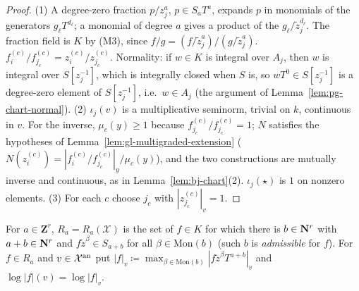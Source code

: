 \begin{proof}
(1) A degree-zero fraction $p/z_j^a$, $p\in S_a T^a$, expands $p$ in monomials of the generators $g_\ell T^{d_\ell}$; a monomial of degree $a$
gives a product of the $g_\ell/\tilde z_j^{d_\ell}$. The fraction field is $K$ by (M3), since $f/g=(f/\tilde z_j^a)/(g/\tilde z_j^a)$.
$f^{(c)}_i/f^{(c)}_{j_c}=z^{(c)}_i/z^{(c)}_{j_c}$. Normality: if $w\in K$ is integral over $A_j$, then $w$ is integral over $S[z_j^{-1}]$,
which is integrally closed when $S$ is, so $wT^0\in S[z_j^{-1}]$ is a degree-zero element of $S[z_j^{-1}]$, i.e.\ $w\in A_j$ (the
argument of Lemma~\ref{lem:pg-chart-normal}). (2) $\iota_j(v)$ is a multiplicative seminorm, trivial on $k$, continuous in $v$. For the inverse,
$\mu_c(y)\ge1$ because $f^{(c)}_{j_c}/f^{(c)}_{j_c}=1$; $N$ satisfies the hypotheses of Lemma~\ref{lem:gl-multigraded-extension} ($N(z^{(c)}_i)=
|f^{(c)}_i/f^{(c)}_{j_c}|_y/\mu_c(y)$), and the two constructions are mutually inverse and continuous, as in Lemma~\ref{lem:bj-chart}(2).
$\iota_j(\star)$ is $1$ on nonzero elements. (3) For each $c$ choose $j_c$ with $|z^{(c)}_{j_c}|_v=1$.
\end{proof}

\begin{definition}\label{def:gl-sections}
\leanok
{}
For $a\in\mathbf Z^r$, $R_a=R_a(\mathcal X)$ is the set of $f\in K$ for which there is $b\in\mathbf{N}^r$ with $a+b\in\mathbf{N}^r$ and
$f\tilde z^\beta\in S_{a+b}$ for all $\beta\in\mathrm{Mon}(b)$ (such $b$ is \emph{admissible} for $f$). For $f\in R_a$ and
$v\in\mathcal X^{\mathrm{an}}$ put $|f|_v\coloneqq\max_{\beta\in\mathrm{Mon}(b)}|f\tilde z^\beta T^{a+b}|_v$ and $\log|f|(v)=\log|f|_v$.
\end{definition}

